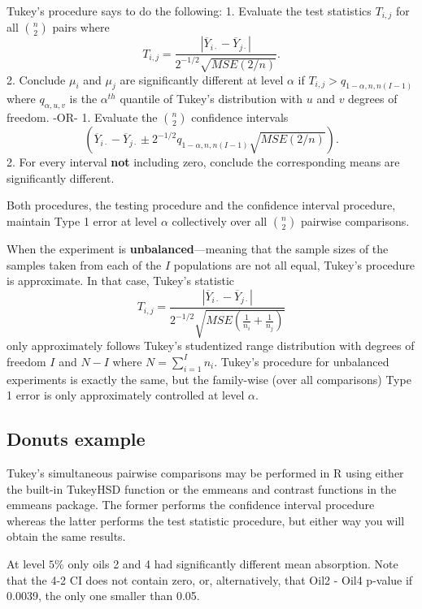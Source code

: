 \documentclass[
]{book}
\begin{document}
Tukey's procedure says to do the following:
1. Evaluate the test statistics \(T_{i,j}\) for all \({n\choose 2}\) pairs where
\[T_{i,j} = \frac{\left|\overline Y_{i\cdot} - \overline Y_{j\cdot}\right|}{2^{-1/2}\sqrt{MSE(2/n)}}.\]
2. Conclude \(\mu_i\) and \(\mu_j\) are significantly different at level \(\alpha\) if \(T_{i,j} > q_{1-\alpha, n, n(I-1)}\) where \(q_{\alpha,u,v}\) is the \(\alpha^{th}\) quantile of Tukey's distribution with \(u\) and \(v\) degrees of freedom.
-OR-
1. Evaluate the \({n\choose 2}\) confidence intervals
\[(\overline Y_{i\cdot} - \overline Y_{j\cdot}\pm 2^{-1/2}q_{1-\alpha, n, n(I-1)}\sqrt{MSE(2/n)}).\]
2. For every interval \textbf{not} including zero, conclude the corresponding means are significantly different.

Both procedures, the testing procedure and the confidence interval procedure, maintain Type 1 error at level \(\alpha\) collectively over all \({n \choose 2}\) pairwise comparisons.

When the experiment is \textbf{unbalanced}---meaning that the sample sizes of the samples taken from each of the \(I\) populations are not all equal, Tukey's procedure is approximate. In that case, Tukey's statistic
\[T_{i,j} = \frac{\left|\overline Y_{i\cdot} - \overline Y_{j\cdot}\right|}{2^{-1/2}\sqrt{MSE\left(\frac{1}{n_i}+\frac{1}{n_j}\right)}}\]
only approximately follows Tukey's studentized range distribution with degrees of freedom \(I\) and \(N-I\) where \(N = \sum_{i=1}^I n_i\). Tukey's procedure for unbalanced experiments is exactly the same, but the family-wise (over all comparisons) Type 1 error is only approximately controlled at level \(\alpha\).

\hypertarget{donuts-example}{%
\subsection{Donuts example}\label{donuts-example}}

Tukey's simultaneous pairwise comparisons may be performed in R using either the built-in TukeyHSD function or the emmeans and contrast functions in the emmeans package. The former performs the confidence interval procedure whereas the latter performs the test statistic procedure, but either way you will obtain the same results.

At level \(5\%\) only oils 2 and 4 had significantly different mean absorption. Note that the 4-2 CI does not contain zero, or, alternatively, that Oil2 - Oil4 p-value if 0.0039, the only one smaller than 0.05.
\end{document}
